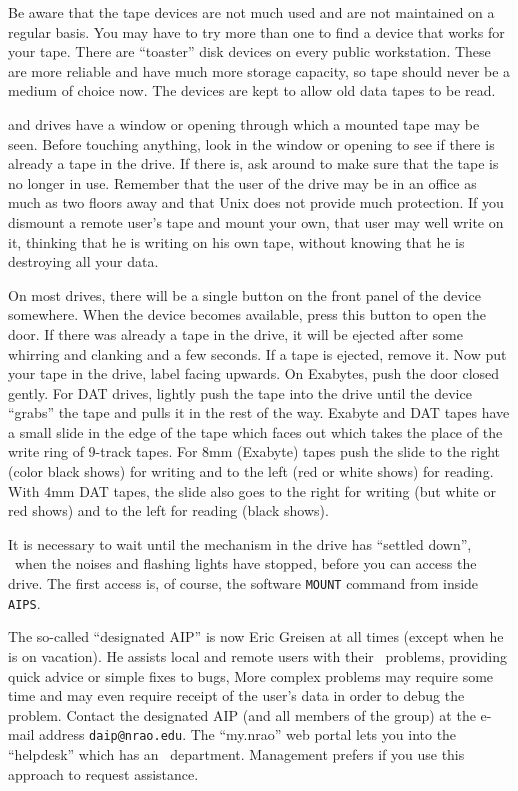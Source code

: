 
     Be aware that the tape devices are not much used and are not
maintained on a regular basis.  You may have to try more than one to
find a device that works for your tape.  There are ``toaster'' disk
devices on every public workstation.  These are more reliable and have
much more storage capacity, so tape should never be a medium of choice
now.  The devices are kept to allow old data tapes to be read.

      and  drives have a window or
opening through which a mounted tape may be seen.  Before touching
anything, look in the window or opening to see if there is already a
tape in the drive.  If there is, ask around to make sure that the tape
is no longer in use.  Remember that the user of the drive may be in an
office as much as two floors away and that Unix does not provide much
protection.  If you dismount a remote user's tape and mount your own,
that user may well write on it, thinking that he is writing on his own
tape, without knowing that he is destroying all your data.

     On most drives, there will be a single button on the front panel
of the device somewhere.  When the device becomes available, press
this button to open the door.  If there was already a tape in the
drive, it will be ejected after some whirring and clanking and a few
seconds.  If a tape is ejected, remove it.  Now put your tape in the
drive, label facing upwards.  On Exabytes, push the door closed
gently.  For DAT drives, lightly push the tape into the drive until
the device ``grabs'' the tape and pulls it in the rest of the way.
Exabyte and DAT tapes have a small slide in the edge of the tape which
faces out which takes the place of the write ring of 9-track tapes.
For 8mm (Exabyte) tapes push the slide to the right (color black
shows) for writing and to the left (red or white shows) for reading.
With 4mm DAT tapes, the slide also goes to the right for writing (but
white or red shows) and to the left for reading (black shows).

     It is necessary to wait until the mechanism in the drive has
``settled down'', \ie\ when the noises and flashing lights have stopped,
before you can access the drive.  The first access is, of course, the
software {\tt MOUNT} command from inside \hbox{{\tt AIPS}}.


The so-called ``designated AIP'' is now Eric Greisen at all times
(except when he is on vacation).  He assists local and remote users
with their \AIPS\ problems, providing quick advice or simple fixes to
bugs,  More complex problems may require some time and may even require
receipt of the user's data in order to debug the problem.  Contact
the designated AIP (and all members of the group) at the e-mail
address {\tt daip@nrao.edu}.  The ``my.nrao'' web portal lets you into
the ``helpdesk'' which has an \AIPS\ department.  Management prefers
if you use this approach to request assistance.

